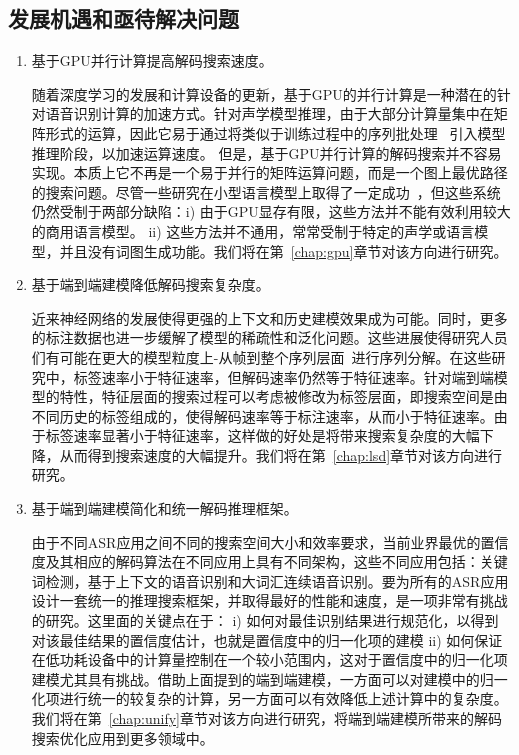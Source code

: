 \subsection{发展机遇和亟待解决问题}
\label{chap:intro2-dec-todo}
\begin{enumerate}
\item 基于GPU并行计算提高解码搜索速度。

随着深度学习的发展和计算设备的更新，基于GPU的并行计算是一种潜在的针对语音识别计算的加速方式。针对声学模型推理，由于大部分计算量集中在矩阵形式的运算，因此它易于通过将类似于训练过程中\cite{vesely2010parallel}的序列批处理~\cite{dixon2009harnessing} 引入模型推理阶段，以加速运算速度。
但是，基于GPU并行计算的解码搜索并不容易实现。本质上它不再是一个易于并行的矩阵运算问题，而是一个图上最优路径的搜索问题。尽管一些研究在小型语言模型上取得了一定成功~\cite{you2009parallel}，但这些系统仍然受制于两部分缺陷：i) 由于GPU显存有限，这些方法并不能有效利用较大的商用语言模型。
ii) 这些方法并不通用，常常受制于特定的声学或语言模型，并且没有词图生成功能。我们将在第~\ref{chap:gpu}章节对该方向进行研究。

\item 基于端到端建模降低解码搜索复杂度。

近来神经网络的发展使得更强的上下文和历史建模效果成为可能\cite{sak2014long,qian2016very}。同时，更多的标注数据也进一步缓解了模型的稀疏性和泛化问题。这些进展使得研究人员们有可能在更大的模型粒度上-从帧到整个序列层面~\cite{amodei2015deep,soltau2016neural,collobert2016wav2letter,sak2015fast,chan2016end}进行序列分解。在这些研究中，标签速率小于特征速率，但解码速率仍然等于特征速率。针对端到端模型的特性，特征层面的搜索过程可以考虑被修改为标签层面，即搜索空间是由不同历史的标签组成的，使得解码速率等于标注速率，从而小于特征速率。由于标签速率显著小于特征速率，这样做的好处是将带来搜索复杂度的大幅下降，从而得到搜索速度的大幅提升。我们将在第~\ref{chap:lsd}章节对该方向进行研究。

\item 基于端到端建模简化和统一解码推理框架。

由于不同ASR应用之间不同的搜索空间大小和效率要求，当前业界最优的置信度及其相应的解码算法在不同应用上具有不同架构，这些不同应用包括：关键词检测，基于上下文的语音识别和大词汇连续语音识别。要为所有的ASR应用设计一套统一的推理搜索框架，并取得最好的性能和速度，是一项非常有挑战的研究。这里面的关键点在于： i) 如何对最佳识别结果进行规范化，以得到对该最佳结果的置信度估计，也就是置信度中的归一化项的建模   ii) 如何保证在低功耗设备中的计算量控制在一个较小范围内，这对于置信度中的归一化项建模尤其具有挑战。借助上面提到的端到端建模，一方面可以对建模中的归一化项进行统一的较复杂的计算，另一方面可以有效降低上述计算中的复杂度。我们将在第~\ref{chap:unify}章节对该方向进行研究，将端到端建模所带来的解码搜索优化应用到更多领域中。

\end{enumerate}
